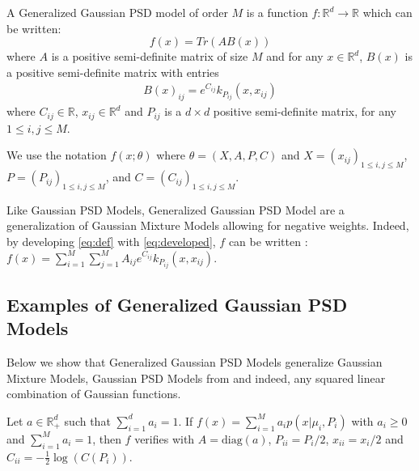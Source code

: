 \begin{definition}\label{definition:ggpsd}
A Generalized Gaussian PSD model of order $M$ is a function $f: \mathbb R^d \to\mathbb R$ which can be written:
\begin{equation}\label{eq:def}
    f(x) = Tr(AB(x))%
\end{equation}
where $A$ is a positive semi-definite matrix of size $M$ and for any $x\in\mathbb R^d$, $B(x)$ is a positive semi-definite matrix with entries
\begin{align}\label{eq:developed}
    B(x)_{ij}=e^{C_{ij}}k_{P_{ij}}(x, x_{ij})
\end{align}
where $C_{ij} \in \mathbb R$, $x_{ij}\in\mathbb R^d$ and $P_{ij}$ is a $d\times d$ positive semi-definite matrix, for any $1\leq i,j\leq M$.
\end{definition}
We use the notation $f(x; \theta)$ where $\theta = (X, A, P, C)$ and $X = (x_{ij})_{1 \leq i,j\leq M}$, $P=(P_{ij})_{1 \leq i,j\leq M}$, and $C=(C_{ij})_{1 \leq i,j\leq M}$.

Like Gaussian PSD Models, Generalized Gaussian PSD Model are a generalization of Gaussian Mixture Models allowing for negative weights. Indeed, by developing \cref{eq:def} with \cref{eq:developed}, $f$ can be written :  $f(x) = \sum_{i=1}^M\sum_{j=1}^M A_{ij}e^{C_{ij}}k_{P_{ij}}(x, x_{ij})$.

\subsection{Examples of Generalized Gaussian PSD Models}
Below we show that Generalized Gaussian PSD Models generalize Gaussian Mixture Models, Gaussian PSD Models from \cite{ciliberto2021} and indeed, any squared linear combination of Gaussian functions.

\begin{example}
Let $a\in\mathbb R^d_+$ such that $\sum_{i=1}^d a_i=1$. If $f(x) = \sum_{i=1}^M a_i p(x | \mu_i, P_i)$ with $a_i \geq 0$ and $\sum_{i=1}^Ma_i = 1$, then $f$ verifies  with $A=\text{diag}(a)$, $P_{ii} = P_i/2$, $x_{ii}=x_i/2$ and $C_{ii} = - \frac{1}{2}\log(C(P_i))$.
\end{example}

